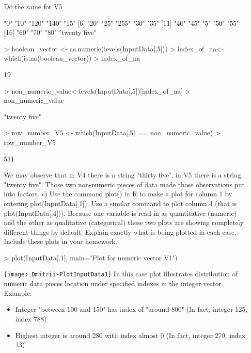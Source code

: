 \documentclass[12pt]{article}
\begin{document}
Do the same for V5
\begin{Schunk}
\begin{Soutput}
 [1] "0"           "10"          "120"         "140"         "15"         
 [6] "20"          "25"          "255"         "30"          "35"         
[11] "40"          "45"          "5"           "50"          "55"         
[16] "60"          "70"          "80"          "twenty five"
\end{Soutput}
\begin{Sinput}
> boolean_vector <- as.numeric(levels(InputData[,5]))
> index_of_na<-which(is.na(boolean_vector))
> index_of_na
\end{Sinput}
\begin{Soutput}
[1] 19
\end{Soutput}
\begin{Sinput}
> non_numeric_value<-levels(InputData[,5])[index_of_na]
> non_numeric_value
\end{Sinput}
\begin{Soutput}
[1] "twenty five"
\end{Soutput}
\begin{Sinput}
> row_number_V5 <- which(InputData[,5] == non_numeric_value)
> row_number_V5
\end{Sinput}
\begin{Soutput}
[1] 531
\end{Soutput}
\end{Schunk}
We may observe that in V4 there is a string "thirty five", in V5 there is a string "twenty five".
Those two non-numeric pieces of data made those observations put into factors.
\newpage
c) Use the command plot() in R to make a plot for column 1 by entering
plot(InputData[,1]). Use a similar command to plot column 4 (that is plot(InputData[,4])).
Because one variable is read in as quantitative (numeric) and the other as qualitative
(categorical) these two plots are showing completely different things by default. Explain
exactly what is being plotted in each case. Include these plots in your homework.

\begin{Schunk}
\begin{Sinput}
> plot(InputData[,1], main="Plot for numeric vector V1")
\end{Sinput}
\end{Schunk}
\texttt{[image: Dmitrii-PlotInputData1]}
\tabularnewline
In this case plot illustrates distribution of numeric data pieces location under specified 
indexes in the integer vector. 
Example: 
\begin{itemize}
\item {Integer "between 100 and 150" has index of "around 800" (In fact, integer 125, index 788)}
\item {Highest integer is around 280 with index almost 0 (In fact, integer 270, index 13)}
\end{itemize}
\end{document}
